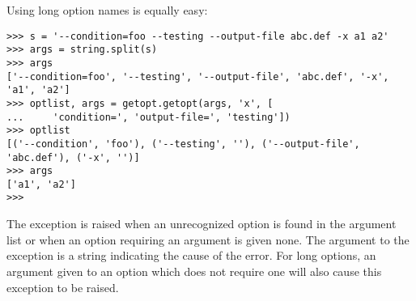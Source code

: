 Using long option names is equally easy:

\bcode\begin{verbatim}
>>> s = '--condition=foo --testing --output-file abc.def -x a1 a2'
>>> args = string.split(s)
>>> args
['--condition=foo', '--testing', '--output-file', 'abc.def', '-x', 'a1', 'a2']
>>> optlist, args = getopt.getopt(args, 'x', [
...     'condition=', 'output-file=', 'testing'])
>>> optlist
[('--condition', 'foo'), ('--testing', ''), ('--output-file', 'abc.def'), ('-x', '')]
>>> args
['a1', 'a2']
>>> 
\end{verbatim}\ecode

The exception
is raised when an unrecognized option is found in the argument list or
when an option requiring an argument is given none.
The argument to the exception is a string indicating the cause of the
error.  For long options, an argument given to an option which does
not require one will also cause this exception to be raised.
